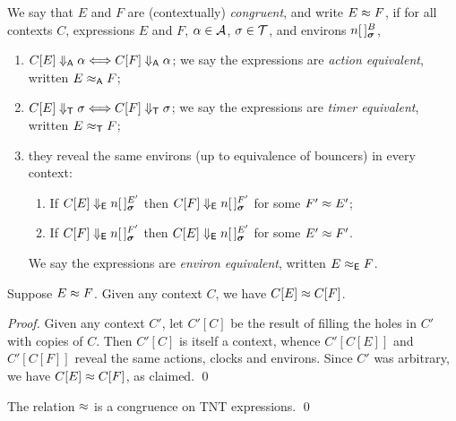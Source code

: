 \documentclass[orivec,envcountsame]{llncs}
\begin{document}
\begin{definition}

We say that $E$ and $F$ are (contextually) \emph{congruent}, and write
$E \approx F$, if for all contexts $C$, expressions $E$ and
$F$, $\alpha \in \text{$\mathcal{A}$}$, $\sigma \in \text{$\mathcal{T}$}$, and environs
$\locv{n}{\,}{B}{\vec{\sigma}}$,

\begin{enumerate}
\item
     $C[E] \mathrel{\Downarrow_{\textsf{A}}} \alpha \Longleftrightarrow C[F] \mathrel{\Downarrow_{\textsf{A}}} \alpha$;
     we say the expressions are \emph{action equivalent}, written $E \mathrel{\approx_{\textsf{A}}}
     F$; 
\item
     $C[E] \mathrel{\Downarrow_{\textsf{T}}} \sigma \Longleftrightarrow C[F] \mathrel{\Downarrow_{\textsf{T}}} \sigma$; we
     say the expressions are \emph{timer equivalent}, written   $E \mathrel{\approx_{\textsf{T}}}
     F$; 
\item
     they reveal the same environs (up to equivalence of bouncers) in every 
     context:
     \begin{enumerate}
     \item
        If $C[E] \RevealsE \locv{n}{\,}{E'}{\vec{\sigma}}$ then
        $C[F] \RevealsE \locv{n}{\,}{F'}{\vec{\sigma}}$
        for some $F' \approx E'$;
     \item
        If $C[F] \RevealsE \locv{n}{\,}{F'}{\vec{\sigma}}$ then
        $C[E] \RevealsE \locv{n}{\,}{E'}{\vec{\sigma}}$
        for some $E' \approx F'$.
     \end{enumerate}
     We say the expressions are \emph{environ equivalent}, written $E \mathrel{\approx_{\textsf{E}}} 
     F$.
\end{enumerate}

\end{definition}


\begin{proposition}
\label{prop:context-substitution} 
Suppose $E \approx F$. Given any context $C$, we have $C[E]
\approx C[F]$.
\end{proposition}
\begin{proof}
Given any context $C'$, let $C'[C]$ be the result of filling the
holes in $C'$ with copies of $C$. Then $C'[C]$ is itself a context,
whence $C'[C[E]]$ and $C'[C[F]]$ reveal the same actions,
clocks and environs. Since $C'$ was arbitrary, we have $C[E] \approx
C[F]$, as claimed.
\qed \end{proof}

\begin{theorem}
The relation $\approx$ is a congruence on TNT expressions. \qed
\end{theorem}
\end{document}
